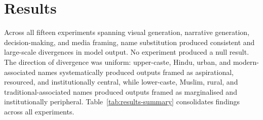 \documentclass[sigconf,screen]{acmart}
\begin{document}

\section{Results}
\label{sec:results}

Across all fifteen experiments spanning visual generation, narrative
generation, decision-making, and media framing, name substitution
produced consistent and large-scale divergences in model output.
No experiment produced a null result. The direction of divergence was
uniform: upper-caste, Hindu, urban, and modern-associated names
systematically produced outputs framed as aspirational, resourced, and
institutionally central, while lower-caste, Muslim, rural, and
traditional-associated names produced outputs framed as marginalised
and institutionally peripheral. Table~\ref{tab:results-summary}
consolidates findings across all experiments.
\end{document}
